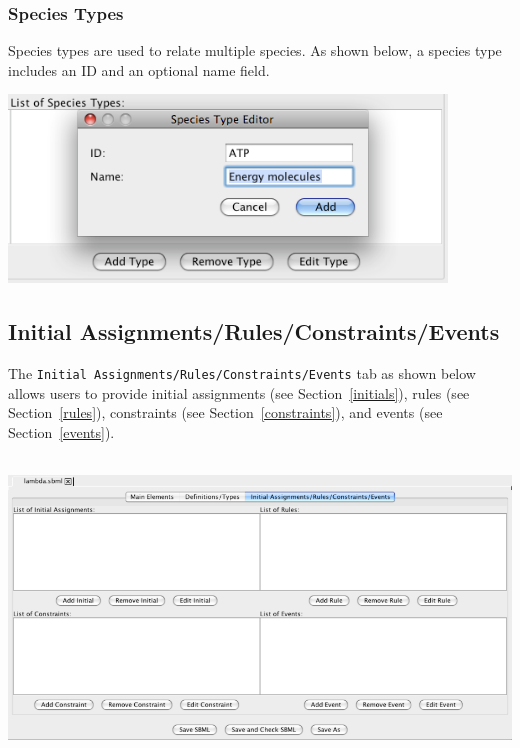 \documentclass[titlepage,11pt]{article}
\begin{document}
\subsubsection{\label{specTypes}Species Types}

\noindent
Species types are used to relate multiple species.  As shown below, a 
species type includes an ID and an optional name field.
\begin{center}
\includegraphics[height=50mm]{screenshots/specType}
\end{center}

\subsection{\label{InitRuleConstEvent}Initial Assignments/Rules/Constraints/Events}

\noindent
The {\tt Initial Assignments/Rules/Constraints/Events} 
tab as shown below allows users to provide initial assignments 
(see Section~\ref{initials}), 
rules (see Section~\ref{rules}), 
constraints (see Section~\ref{constraints}), and
events (see Section~\ref{events}).
\begin{center}
\includegraphics[height=80mm]{screenshots/IRCE}
\end{center}
\end{document}
